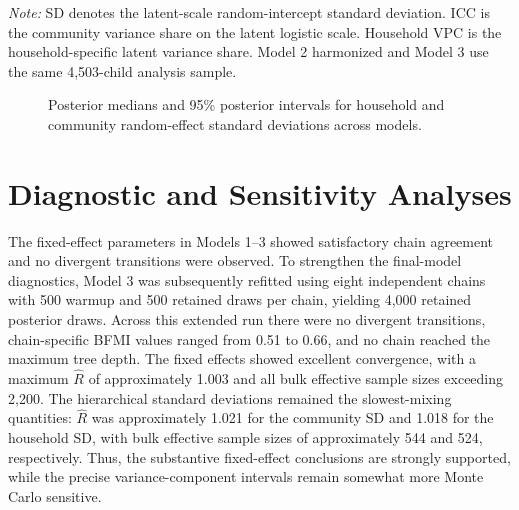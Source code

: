 \begin{table}[H]
\centering
\caption{Posterior summaries of hierarchical heterogeneity across models}
\label{tab:variance_comparison}

\vspace{0.4em}
\begin{minipage}{0.94\textwidth}
\footnotesize
\textit{Note:} SD denotes the latent-scale random-intercept standard deviation. ICC is the community variance share on the latent logistic scale. Household VPC is the household-specific latent variance share. Model 2 harmonized and Model 3 use the same 4,503-child analysis sample.
\end{minipage}
\end{table}

\begin{figure}[H]
\centering

\caption{Posterior medians and 95\% posterior intervals for household and community random-effect standard deviations across models.}
\label{fig:variance_comparison}
\end{figure}

\section{Diagnostic and Sensitivity Analyses}

The fixed-effect parameters in Models 1--3 showed satisfactory chain agreement and no divergent transitions were observed. To strengthen the final-model diagnostics, Model 3 was subsequently refitted using eight independent chains with 500 warmup and 500 retained draws per chain, yielding 4,000 retained posterior draws. Across this extended run there were no divergent transitions, chain-specific BFMI values ranged from 0.51 to 0.66, and no chain reached the maximum tree depth. The fixed effects showed excellent convergence, with a maximum $\hat R$ of approximately 1.003 and all bulk effective sample sizes exceeding 2,200. The hierarchical standard deviations remained the slowest-mixing quantities: $\hat R$ was approximately 1.021 for the community SD and 1.018 for the household SD, with bulk effective sample sizes of approximately 544 and 524, respectively. Thus, the substantive fixed-effect conclusions are strongly supported, while the precise variance-component intervals remain somewhat more Monte Carlo sensitive.


